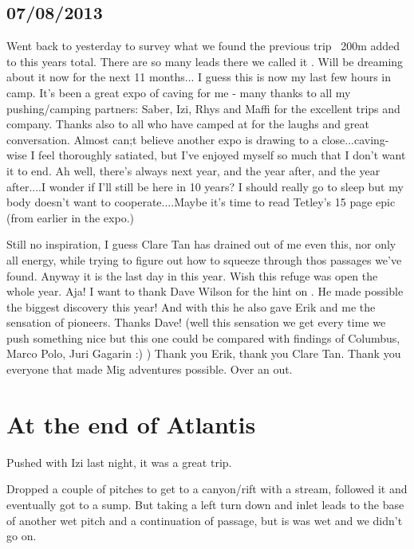\subsection{07/08/2013}
Went back to  yesterday to survey what we found the previous trip ~200m added to this years total. There are so many leads there we called it . Will be dreaming about it now for the next 11 months...
I guess this is now my last few hours in camp. It's been a great expo of caving for me - many thanks to all my pushing/camping partners: Saber, Izi, Rhys and Maffi for the excellent trips and company. Thanks also to all who have camped at  for the laughs and great conversation.
Almost can;t believe another expo is drawing to a close...caving-wise I feel thoroughly satiated, but I've enjoyed myself so much that I don't want it to end. Ah well, there's always next year, and the year after, and the year after....I wonder if I'll still be here in 10 years?
I should really go to sleep but my body doesn't want to cooperate....Maybe it's time to read Tetley's 15 page epic (from earlier in the expo.)

Still no inspiration, I guess Clare Tan has drained out of me even this, nor only all energy, while trying to figure out how to squeeze through thos passages we've found. Anyway it is the last day in  this year. Wish this refuge was open the whole year. Aja! I want to thank Dave Wilson for the hint on . He made possible the biggest discovery this year! And with this he also gave Erik and me the sensation of pioneers. Thanks Dave! (well this sensation we get every time we push something nice but this one could be compared with findings of Columbus, Marco Polo, Juri Gagarin :) ) Thank you Erik, thank you Clare Tan. Thank you everyone that made Mig adventures possible. Over an out.

\section{At the end of Atlantis} 
Pushed  with Izi last night, it was a great trip. 

Dropped a couple of pitches to get to a canyon/rift with a stream, followed it and eventually got to a sump. But taking a left turn down and inlet leads to the base of another wet pitch and a continuation of passage, but is was wet and we didn't go on. 



